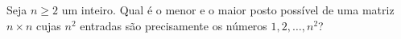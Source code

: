 Seja \( n\ge 2\) um inteiro. Qual é o menor e o maior posto possível de uma matriz \( n\times n\) cujas \( n^{2}\) entradas são precisamente os números \( 1, 2, \ldots, n^{2}\)?
